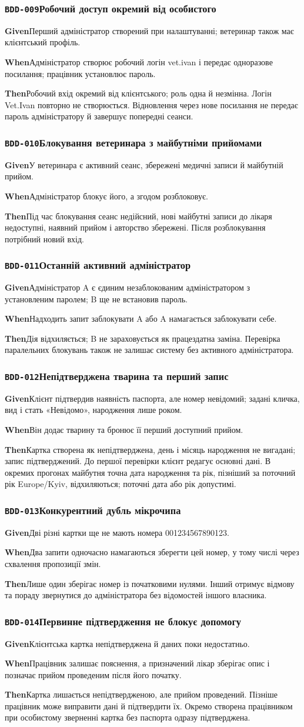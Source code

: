 \documentclass[11pt,a4paper]{article}
\newcommand{\scenario}[5]{%
  \Needspace{8\baselineskip}%
  \subsubsection*{\hypertarget{#1}{\texttt{#1}}\quad #2}%
  \textbf{Given}\quad #3\par
  \textbf{When}\quad #4\par
  \textbf{Then}\quad #5\par\medskip}
\begin{document}
\scenario{BDD-009}{Робочий доступ окремий від особистого}{Перший адміністратор створений при налаштуванні; ветеринар також має клієнтський профіль.}{Адміністратор створює робочий логін vet.ivan і передає одноразове посилання; працівник установлює пароль.}{Робочий вхід окремий від клієнтського; роль одна й незмінна. Логін Vet.Ivan повторно не створюється. Відновлення через нове посилання не передає пароль адміністратору й завершує попередні сеанси.}

\scenario{BDD-010}{Блокування ветеринара з майбутніми прийомами}{У ветеринара є активний сеанс, збережені медичні записи й майбутній прийом.}{Адміністратор блокує його, а згодом розблоковує.}{Під час блокування сеанс недійсний, нові майбутні записи до лікаря недоступні, наявний прийом і авторство збережені. Після розблокування потрібний новий вхід.}

\scenario{BDD-011}{Останній активний адміністратор}{Адміністратор A є єдиним незаблокованим адміністратором з установленим паролем; B ще не встановив пароль.}{Надходить запит заблокувати A або A намагається заблокувати себе.}{Дія відхиляється; B не зараховується як працездатна заміна. Перевірка паралельних блокувань також не залишає систему без активного адміністратора.}

\scenario{BDD-012}{Непідтверджена тварина та перший запис}{Клієнт підтвердив наявність паспорта, але номер невідомий; задані кличка, вид і стать «Невідомо», народження лише роком.}{Він додає тварину та бронює її перший доступний прийом.}{Картка створена як непідтверджена, день і місяць народження не вигадані; запис підтверджений. До першої перевірки клієнт редагує основні дані. В окремих прогонах майбутня точна дата народження та рік, пізніший за поточний рік Europe/Kyiv, відхиляються; поточні дата або рік допустимі.}

\scenario{BDD-013}{Конкурентний дубль мікрочипа}{Дві різні картки ще не мають номера 001234567890123.}{Два запити одночасно намагаються зберегти цей номер, у тому числі через схвалення пропозиції змін.}{Лише один зберігає номер із початковими нулями. Інший отримує відмову та пораду звернутися до адміністратора без відомостей іншого власника.}

\scenario{BDD-014}{Первинне підтвердження не блокує допомогу}{Клієнтська картка непідтверджена й даних поки недостатньо.}{Працівник залишає пояснення, а призначений лікар зберігає опис і позначає прийом проведеним після його початку.}{Картка лишається непідтвердженою, але прийом проведений. Пізніше працівник може виправити дані й підтвердити їх. Окремо створена працівником при особистому зверненні картка без паспорта одразу підтверджена.}
\end{document}
